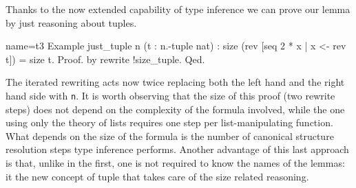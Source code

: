 Thanks to the now extended capability of type inference
we can prove our lemma by just reasoning about tuples.

\begin{coq}{name=t3}{}
Example just_tuple n (t : n.-tuple nat) :
  size (rev [seq 2 * x | x <- rev t]) = size t.
Proof. by rewrite !size_tuple. Qed.
\end{coq}

The iterated rewriting acts now twice replacing both the left hand
and the right hand side with \lstinline/n/.  It is worth observing
that the size of this proof (two rewrite steps) does not depend on the
complexity of the formula involved, while the one using only the
theory of lists requires one step per list-manipulating function.
What depends on the size of the formula is the number of canonical
structure resolution steps type inference performs.  Another advantage
of this last approach is that, unlike in the first, one
is not required to know the names of the lemmas:
it the new concept of tuple that takes care of the size related
reasoning.

% 
% 
% 
% 

